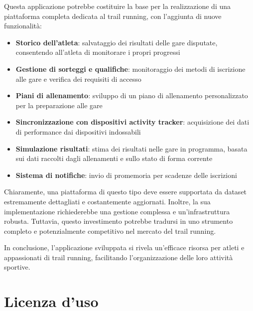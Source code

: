 \documentclass[a4paper, 12pt, oneside]{book}
\begin{document}
Questa applicazione potrebbe costituire la base per la realizzazione di una piattaforma completa dedicata al trail running, con l'aggiunta di nuove funzionalità: 
\begin{itemize}
    \item \textbf{Storico dell'atleta}: salvataggio dei risultati delle gare disputate, consentendo all'atleta di monitorare i propri progressi
    \item \textbf{Gestione di sorteggi e qualifiche}: monitoraggio dei metodi di iscrizione alle gare e verifica dei requisiti di accesso 
    \item \textbf{Piani di allenamento}: sviluppo di un piano di allenamento personalizzato per la preparazione alle gare
    \item \textbf{Sincronizzazione con dispositivi activity tracker}: acquisizione dei dati di performance dai dispositivi indossabili
    \item \textbf{Simulazione risultati}: stima dei risultati nelle gare in programma, basata sui dati raccolti dagli allenamenti e sullo stato di forma corrente
    \item \textbf{Sistema di notifiche}: invio di promemoria per scadenze delle iscrizioni
\end{itemize}
Chiaramente, una piattaforma di questo tipo deve essere supportata da dataset estremamente dettagliati e costantemente aggiornati. Inoltre, la sua implementazione richiederebbe una gestione complessa e un'infrastruttura robusta. Tuttavia, questo investimento potrebbe tradursi in uno strumento completo e potenzialmente competitivo nel mercato del trail running.

In conclusione, l'applicazione sviluppata si rivela un'efficace risorsa per atleti e appassionati di trail running, facilitando l'organizzazione delle loro attività sportive. 

\newpage
\section*{Licenza d'uso}
\doclicenseThis
\end{document}
